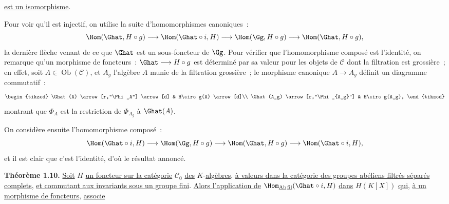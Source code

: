 
\uline{est un
isomorphisme}.

Pour voir qu'il est injectif, on utilise la suite d'homomorphismes canoniques~:
\[
  \Hom(\Ghat,H\circ g)\longrightarrow
  \Hom(\Ghat\circ i,H)\longrightarrow
  \Hom(\Gg,H\circ g)\longrightarrow
  \Hom(\Ghat,H\circ g),
\]
la dernière flèche venant de ce que \(\Ghat\) est un sous-foncteur de \(\Gg\). Pour vérifier que l'homomorphisme composé est l'identité, on remarque qu'un morphisme de foncteurs~: \(\Ghat\longrightarrow H\circ g\) est déterminé par sa valeur pour les objets de \(\mathcal C\) dont la filtration est grossière~; en effet, soit \(A\in\operatorname{Ob}(\mathcal C)\), et \(A_g\) l'algèbre \(A\) munie de la filtration grossière~; le morphisme canonique \(A\to A_g\) définit un diagramme commutatif~:
\[
\begin{tikzcd}
\Ghat(A) \arrow[r,"\Phi_A"] \arrow[d] &
H\circ g(A) \arrow[d]\\
\Ghat(A_g) \arrow[r,"\Phi_{A_g}"] &
H\circ g(A_g),
\end{tikzcd}
\]
montrant que \(\Phi_A\) est la restriction de \(\Phi_{A_g}\) à \(\Ghat(A)\).

On considère ensuite l'homomorphisme composé~:
\[
  \Hom(\Ghat\circ i,H)\longrightarrow
  \Hom(\Gg,H\circ g)\longrightarrow
  \Hom(\Ghat,H\circ g)\longrightarrow
  \Hom(\Ghat\circ i,H),
\]
et il est clair que c'est l'identité, d'où le résultat annoncé.

\textbf{Théorème 1.10.} \uline{Soit} \(H\) \uline{un foncteur sur la catégorie} \(\mathcal C_0\) \uline{des} \(K\)-\uline{algèbres}, \uline{à valeurs dans la catégorie des groupes abéliens filtrés séparés complets}, \uline{et commutant aux invariants sous un groupe fini}. \uline{Alors l'application de} \(\Hom_{\underline{\mathrm{Ab}}\,\underline{\mathrm{fil}}}(\Ghat\circ i,H)\) \uline{dans} \(H(K[X])\) \uline{qui}, \uline{à un morphisme de foncteurs}, \uline{associe}
